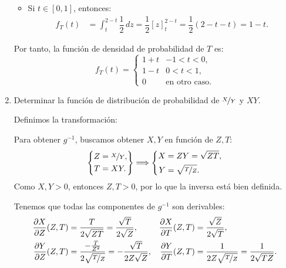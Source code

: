\documentclass[12pt]{article}
\begin{document}
\begin{ejercicio}
\begin{enumerate}
\begin{itemize}
                \item Si $t\in [0,1]$, entonces:
                \begin{align*}
                    f_T(t)&=\int_{t}^{2-t} \dfrac{1}{2} \, dz = \dfrac{1}{2}\left[z\right]_{t}^{2-t} = \dfrac{1}{2}(2-t-t) = 1-t.
                \end{align*}
            \end{itemize}
    
            Por tanto, la función de densidad de probabilidad de $T$ es:
            \begin{equation*}
                f_T(t) = \begin{cases}
                    1+t & -1<t<0, \\
                    1-t & 0<t<1, \\
                    0 & \text{en otro caso}.
                \end{cases}
            \end{equation*}
            
    
            \item Determinar la función de distribución de probabilidad de $\nicefrac{X}{Y}$ y $XY$.
    
            Definimos la transformación:
    
            Para obtener $g^{-1}$, buscamos obtener $X,Y$ en función de $Z,T$:
            \begin{equation*}
                \left\{\begin{aligned}
                    Z&=\nicefrac{X}{Y}, \\
                    T&=XY.
                \end{aligned}\right\}\Longrightarrow
                \left\{\begin{aligned}
                    X&=ZY=\sqrt{ZT}, \\
                    Y&=\sqrt{\nicefrac{T}{Z}}.
                \end{aligned}\right.
            \end{equation*}
            Como $X,Y>0$, entonces $Z,T>0$, por lo que la inversa está bien definida.
    
            Tenemos que todas las componentes de $g^{-1}$ son derivables:
            \begin{align*}
                \dfrac{\partial X}{\partial Z}(Z,T)&=\dfrac{T}{2\sqrt{ZT}}=\dfrac{\sqrt{T}}{2\sqrt{Z}}, & \dfrac{\partial X}{\partial T}(Z,T)&=\dfrac{\sqrt{Z}}{2\sqrt{T}},\\
                \dfrac{\partial Y}{\partial Z}(Z,T)&=\dfrac{-\frac{T}{Z^2}}{2\sqrt{\nicefrac{T}{Z}}}=-\dfrac{\sqrt{T}}{2Z\sqrt{Z}}, & \dfrac{\partial Y}{\partial T}(Z,T)&=\dfrac{1}{2Z\sqrt{\nicefrac{T}{Z}}}=\dfrac{1}{2\sqrt{TZ}}.
            \end{align*}
    

\end{enumerate}
\end{ejercicio}
\end{document}
